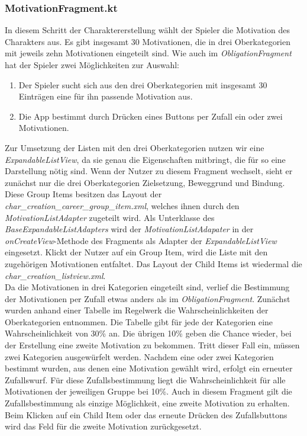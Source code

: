 \subsubsection{MotivationFragment.kt}
In diesem Schritt der Charaktererstellung wählt der Spieler die Motivation des Charakters aus. Es gibt insgesamt 30 Motivationen, die in drei Oberkategorien mit jeweils zehn Motivationen eingeteilt sind. Wie auch im \textit{ObligationFragment} hat der Spieler zwei Möglichkeiten zur Auswahl:
\begin{enumerate}
\item Der Spieler sucht sich aus den drei Oberkategorien mit insgesamt 30 Einträgen eine für ihn passende Motivation aus.
\item Die App bestimmt durch Drücken eines Buttons per Zufall ein oder zwei Motivationen.
\end{enumerate}

Zur Umsetzung der Listen mit den drei Oberkategorien nutzen wir eine \textit{ExpandableListView}, da sie genau die Eigenschaften mitbringt, die für so eine Darstellung nötig sind. Wenn der Nutzer zu diesem Fragment wechselt, sieht er zunächst nur die drei Oberkategorien Zielsetzung, Beweggrund und Bindung. Diese Group Items besitzen das Layout der \textit{char\_creation\_career\_group\_item.xml}, welches ihnen durch den \textit{MotivationListAdapter} zugeteilt wird. Als Unterklasse des \textit{BaseExpandableListAdapters} wird der \textit{MotivationListAdapater} in der \textit{onCreateView}-Methode des Fragments als Adapter der \textit{ExpandableListView} eingesetzt. Klickt der Nutzer auf ein Group Item, wird die Liste mit den zugehörigen Motivationen entfaltet. Das Layout der Child Items ist wiedermal die \textit{char\_creation\_listview.xml}.\\

Da die Motivationen in drei Kategorien eingeteilt sind, verlief die Bestimmung der Motivationen per Zufall etwas anders als im \textit{ObligationFragment}. Zunächst wurden anhand einer Tabelle im Regelwerk \cite[94]{rulebook} die Wahrscheinlichkeiten der Oberkategorien entnommen. Die Tabelle gibt für jede der Kategorien eine Wahrscheinlichkeit von 30\% an. Die übrigen 10\% geben die Chance wieder, bei der Erstellung eine zweite Motivation zu bekommen. Tritt dieser Fall ein, müssen zwei Kategorien ausgewürfelt werden. Nachdem eine oder zwei Kategorien bestimmt wurden, aus denen eine Motivation gewählt wird, erfolgt ein erneuter Zufallswurf. Für diese Zufallsbestimmung liegt die Wahrscheinlichkeit für alle Motivationen der jeweiligen Gruppe bei 10\%. Auch in diesem Fragment gilt die Zufallsbestimmung als einzige Möglichkeit, eine zweite Motivation zu erhalten. Beim Klicken auf ein Child Item oder das erneute Drücken des Zufallsbuttons wird das Feld für die zweite Motivation zurückgesetzt.\\

